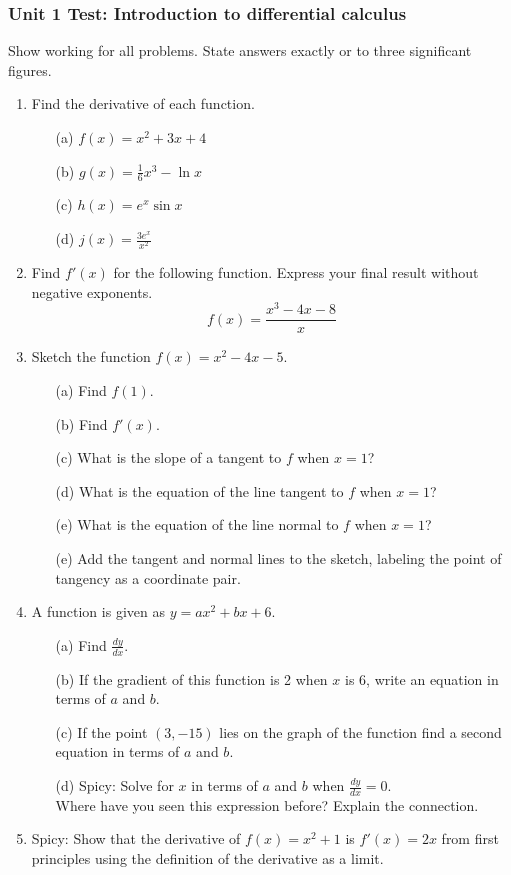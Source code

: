 \documentclass[12pt, oneside]{article}
\begin{document}
\subsubsection*{Unit 1 Test: Introduction to differential calculus}
Show working for all problems. State answers exactly or to three significant figures.
  \vspace{0.5cm}
  \begin{enumerate}

  \item Find the derivative of each function.
  \begin{itemize}
    \item[(a)] $f(x) = x^2 + 3x + 4$
  	\item[(b)] $g(x)=\frac{1}{6}x^3-\ln x$
  	\item[(c)] $h(x)=e^x \sin x$
  	\item[(d)] $\displaystyle j(x)= \frac{3e^x}{x^2}$
  \end{itemize}

  \item Find $f'(x)$  for the following function. Express your final result without negative exponents.
  	 \[	f(x) = \frac{x^3-4x-8}{x}\]

  \item	Sketch the function $f(x) = x^2 - 4x - 5$.
  \begin{itemize}
      \item[(a)] Find $f(1)$.
  	\item[(b)] Find $f'(x)$.
  	\item[(c)] What is the slope of a tangent to $f$ when $x=1$?
  	\item[(d)] What is the equation of the line tangent to $f$ when $x=1$?
  	\item[(e)] What is the equation of the line normal to $f$ when $x=1$?
  	\item[(e)] Add the tangent and normal lines to the sketch, labeling the point of tangency as a coordinate pair.
  \end{itemize}


  \item	A function is given as $y = ax^2 + bx + 6$.
  \begin{itemize}
      \item[(a)] Find $\displaystyle \frac {dy}{dx}$.
  	\item[(b)] If the gradient of this function is 2 when $x$ is 6, write an equation in terms of $a$ and $b$.
  	\item[(c)] If the point $(3, -15)$ lies on the graph of the function find a second equation in terms of $a$ and $b$.
  	\item[(d)] Spicy: Solve for $x$ in terms of $a$ and $b$ when
  	$\displaystyle \frac {dy}{dx}=0$. \\[10pt]
  	Where have you seen this expression before? Explain the connection.
  \end{itemize}

  \item Spicy: Show that the derivative of $f(x)=x^2+1$ is $f'(x)=2x$ from first principles using the definition of the derivative as a limit.

\end{enumerate}
\end{document}
